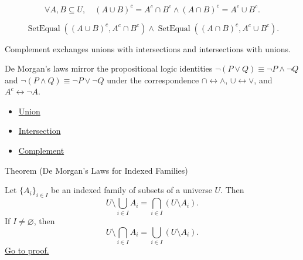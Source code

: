 \begin{remark*}
\[
  \forall A,B\subseteq U,\quad
  (A\cup B)^c=A^c\cap B^c
  \wedge
  (A\cap B)^c=A^c\cup B^c.
\]
\end{remark*}

\begin{remark*}
\[
  \operatorname{SetEqual}((A\cup B)^c,A^c\cap B^c)
  \wedge
  \operatorname{SetEqual}((A\cap B)^c,A^c\cup B^c).
\]
\end{remark*}

\begin{remark*}[Interpretation]
Complement exchanges unions with intersections and intersections with unions.
\end{remark*}

\begin{remark*}[Exposition]
De Morgan's laws mirror the propositional logic identities
$\neg(P \lor Q) \equiv \neg P \land \neg Q$ and
$\neg(P \land Q) \equiv \neg P \lor \neg Q$ under the correspondence
$\cap \leftrightarrow \land$, $\cup \leftrightarrow \lor$, and
$A^c \leftrightarrow \neg A$.
\end{remark*}


\begin{dependencies}
\begin{itemize}
  \item \hyperref[def:union]{Union}
  \item \hyperref[def:intersection]{Intersection}
  \item \hyperref[def:complement]{Complement}
\end{itemize}
\end{dependencies}

\begin{theorembox}{Theorem (De Morgan's Laws for Indexed Families)}
\begin{theorem}\label{thm:indexed-de-morgan}
Let $\{A_i\}_{i\in I}$ be an indexed family of subsets of a universe $U$.
Then
\[
U\setminus\bigcup_{i\in I}A_i
=
\bigcap_{i\in I}(U\setminus A_i).
\]
If $I\neq\varnothing$, then
\[
U\setminus\bigcap_{i\in I}A_i
=
\bigcup_{i\in I}(U\setminus A_i).
\]
\hyperref[prf:indexed-de-morgan]{Go to proof.}
\end{theorem}
\end{theorembox}

